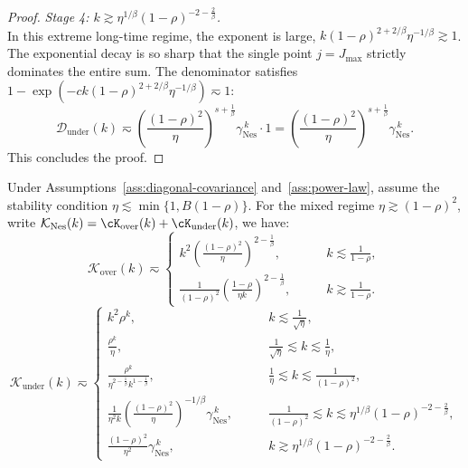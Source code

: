\begin{proof}
\textit{Stage 4: $k \gtrsim \eta^{1/\beta}(1-\rho)^{-2-\frac{2}{\beta}}$.} \\
In this extreme long-time regime, the exponent is large, $k (1-\rho)^{2+2/\beta}\eta^{-1/\beta} \gtrsim 1$. The exponential decay is so sharp that the single point $j = J_{\max}$ strictly dominates the entire sum. The denominator satisfies $1 - \exp\left(-c k (1-\rho)^{2+2/\beta}\eta^{-1/\beta}\right) \eqsim 1$:
\[
    \mathcal{D}_{\mathrm{under}}(k) \eqsim \left(\frac{(1-\rho)^2}{\eta}\right)^{s+\frac{1}{\beta}}\gamma_{\mathrm{Nes}}^{\,k} \cdot 1 = \left(\frac{(1-\rho)^2}{\eta}\right)^{s+\frac{1}{\beta}}\gamma_{\mathrm{Nes}}^{\,k}.
\]
This concludes the proof.
\end{proof}


\begin{lemma}
\label{lem:nes_kernel}
Under Assumptions~\ref{ass:diagonal-covariance} and~\ref{ass:power-law}, assume the stability condition $\eta\lesssim \min\{1,B(1-\rho)\}$. For the mixed regime \(\eta\gtrsim(1-\rho)^2\), write \(\mathcal{K}_{\mathrm{Nes}}(k)=\cK_{\mathrm{over}}(k)+\cK_{\mathrm{under}}(k)\), we have:
\begin{equation*}
    \mathcal{K}_{\mathrm{over}}(k)
    \eqsim
    \begin{cases}
    k^2 \left(\frac{(1-\rho)^2}{\eta}\right)^{2-\frac1\beta},&\qquad k\lesssim \frac{1}{1-\rho},\\
    \frac{1}{(1-\rho)^2}\left(\frac{1-\rho}{\eta k}\right)^{2-\frac1\beta},&\qquad k\gtrsim\frac{1}{1-\rho}.
    \end{cases}
\end{equation*}
\begin{equation*}
    \mathcal{K}_{\mathrm{under}}(k)
    \eqsim
    \begin{cases}
    k^2\rho^k,&\qquad k\lesssim\frac{1}{\sqrt{\eta}},\\
    \frac{\rho^k}{\eta},&\qquad \frac{1}{\sqrt{\eta}} \lesssim k \lesssim \frac{1}{\eta},\\
    \frac{\rho^k}{\eta^{2-\frac1\beta}k^{1-\frac1\beta}},&\qquad \frac{1}{\eta} \lesssim k \lesssim \frac{1}{(1-\rho)^2},\\
    \frac{1}{\eta^2 k}\left(\frac{(1-\rho)^2}{\eta}\right)^{-1/\beta}\gamma_{\mathrm{Nes}}^{\,k}, &\qquad \frac{1}{(1-\rho)^2} \lesssim k \lesssim \eta^{1/\beta}(1-\rho)^{-2-\frac{2}{\beta}},\\
    \frac{(1-\rho)^2}{\eta^2} \gamma_{\mathrm{Nes}}^{\,k}, &\qquad k \gtrsim \eta^{1/\beta}(1-\rho)^{-2-\frac{2}{\beta}}.
    \end{cases}
\end{equation*}
\end{lemma}

